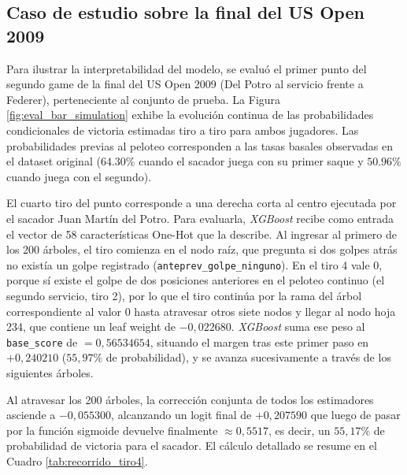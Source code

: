 \documentclass[journal]{IEEEtran}
\begin{document}
\subsection{Caso de estudio sobre la final del US Open 2009}
Para ilustrar la interpretabilidad del modelo, se evaluó el primer punto del segundo game de la final del US Open 2009 (Del Potro al servicio frente a Federer), perteneciente al conjunto de prueba. La Figura \ref{fig:eval_bar_simulation} exhibe la evolución continua de las probabilidades condicionales de victoria estimadas tiro a tiro para ambos jugadores. Las probabilidades previas al peloteo corresponden a las tasas basales observadas en el dataset original ($64.30\%$ cuando el sacador juega con su primer saque y $50.96\%$ cuando juega con el segundo).

El cuarto tiro del punto corresponde a una derecha corta al centro ejecutada por el sacador Juan Martín del Potro. Para evaluarla, \textit{XGBoost} recibe como entrada el vector de 58 características One-Hot que la describe. Al ingresar al primero de los 200 árboles, el tiro comienza en el nodo raíz, que pregunta si dos golpes atrás no existía un golpe registrado (\texttt{anteprev\_golpe\_ninguno}). En el tiro 4 vale 0, porque sí existe el golpe de dos posiciones anteriores en el peloteo continuo (el segundo servicio, tiro 2), por lo que el tiro continúa por la rama del árbol correspondiente al valor 0 hasta atravesar otros siete nodos y llegar al nodo hoja 234, que contiene un leaf weight de $-0{,}022680$. \textit{XGBoost} suma ese peso al \texttt{base\_score} de $= 0{,}56534654$, situando el margen tras este primer paso en $+0{,}240210$ ($55{,}97\%$ de probabilidad), y se avanza sucesivamente a través de los siguientes árboles.

Al atravesar los 200 árboles, la corrección conjunta de todos los estimadores asciende a $-0{,}055300$, alcanzando un logit final de $+0{,}207590$ que luego de pasar por la función sigmoide devuelve finalmente $\approx 0{,}5517$, es decir, un $55{,}17\%$ de probabilidad de victoria para el sacador. El cálculo detallado se resume en el Cuadro \ref{tab:recorrido_tiro4}.
\end{document}
